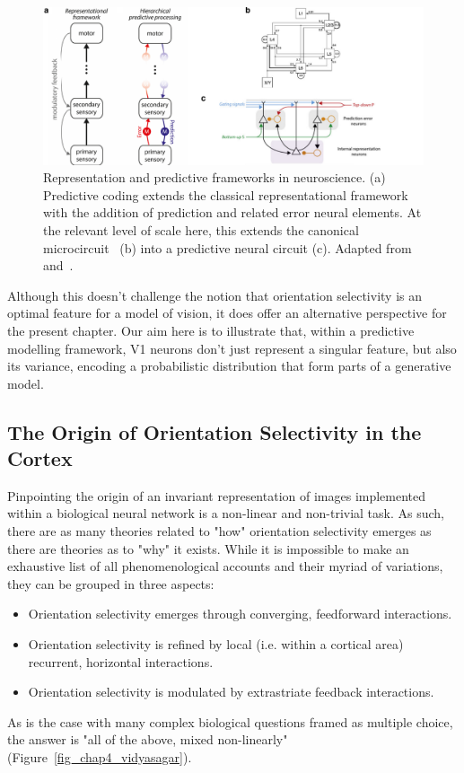 \begin{figure}[h!tbp]
\vspace{0.1cm}
\centering
\includegraphics[width=1.\textwidth]{fig/chap4_representational_framework.pdf}
\caption[Representational and predictive frameworks.]{Representation and predictive frameworks in neuroscience. (a) Predictive coding extends the classical representational framework with the addition of prediction and related error neural elements. At the relevant level of scale here, this extends the canonical microcircuit~\cite{douglas1989canonical} (b) into a predictive neural circuit (c). Adapted from \cite{douglas1989canonical} and~\cite{keller2018predictive}.}
\label{fig_chap4_representational_framework}
\end{figure}

Although this doesn't challenge the notion that orientation selectivity is an optimal feature for a model of vision, it does offer an alternative perspective for the present chapter. Our aim here is to illustrate that, within a predictive modelling framework, \gls{V1} neurons don't just represent a singular feature, but also its variance, encoding a probabilistic distribution that form parts of a generative model.



\subsection{The Origin of Orientation Selectivity in the Cortex}
Pinpointing the origin of an invariant representation of images implemented within a biological neural network is a non-linear and non-trivial task. As such, there are as many theories related to "how" orientation selectivity emerges as there are theories as to "why" it exists. While it is impossible to make an exhaustive list of all phenomenological accounts and their myriad of variations, they can be grouped in three aspects:
\begin{itemize}
    \item Orientation selectivity emerges through converging, feedforward interactions.
    \item Orientation selectivity is refined by local (i.e. within a cortical area) recurrent, horizontal interactions.
    \item Orientation selectivity is modulated by extrastriate feedback interactions. 
\end{itemize}
As is the case with many complex biological questions framed as multiple choice, the answer is "all of the above, mixed non-linearly" (Figure~\ref{fig_chap4_vidyasagar}).


